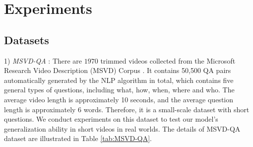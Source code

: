 \documentclass[journal]{IEEEtran}
\begin{document}
\section{Experiments} \label{sec:experiments}
\begin{table}[t]
    \centering
    \caption{Statistics of the MSVD-QA Dataset.}
    \label{tab:MSVD-QA}
\end{table}

\begin{table}[t]
    \centering
    \caption{Statistics of the MSRVTT-QA Dataset.}
    \label{tab:MSRVTT-QA}
\end{table}
\subsection{Datasets}
1) \textit{MSVD-QA} \cite{xu2017video}: There are $1970$ trimmed videos collected from the Microsoft Research Video Description (MSVD) Corpus \cite{chen2011collecting}. It contains 50,500 QA pairs automatically generated by the NLP algorithm in total, which contains five general types of questions, including what, how, when, where and who. The average video length is approximately 10 seconds, and the average question length is approximately 6 words. Therefore, it is a small-scale dataset with short questions. We conduct experiments on this dataset to test our model’s generalization ability in short videos in real worlds. The details of MSVD-QA dataset are illustrated in Table \ref{tab:MSVD-QA}.
\end{document}
